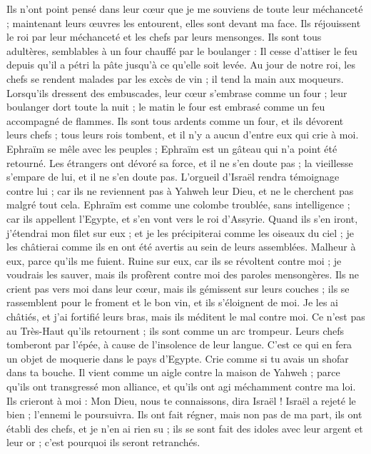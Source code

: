 \begin{multicols}{2}
Ils n'ont point pensé dans leur cœur que je me souviens de toute leur méchanceté ; maintenant leurs œuvres les entourent, elles sont devant ma face.
Ils réjouissent le roi par leur méchanceté et les chefs par leurs mensonges.
Ils sont tous adultères, semblables à un four chauffé par le boulanger : Il cesse d’attiser le feu depuis qu’il a pétri la pâte jusqu'à ce qu'elle soit levée.
Au jour de notre roi, les chefs se rendent malades par les excès de vin ; il tend la main aux moqueurs.
Lorsqu’ils dressent des embuscades, leur cœur s’embrase comme un four ; leur boulanger dort toute la nuit ; le matin le four est embrasé comme un feu accompagné de flammes.
Ils sont tous ardents comme un four, et ils dévorent leurs chefs ; tous leurs rois tombent, et il n'y a aucun d'entre eux qui crie à moi.
Ephraïm se mêle avec les peuples ; Ephraïm est un gâteau qui n'a point été retourné.
Les étrangers ont dévoré sa force, et il ne s’en doute pas ; la vieillesse s’empare de lui, et il ne s’en doute pas.
L'orgueil d'Israël rendra témoignage contre lui ; car ils ne reviennent pas à Yahweh leur Dieu, et ne le cherchent pas malgré tout cela.
Ephraïm est comme une colombe troublée, sans intelligence ; car ils appellent l'Egypte, et s’en vont vers le roi d'Assyrie.
Quand ils s’en iront, j'étendrai mon filet sur eux ; et je les précipiterai comme les oiseaux du ciel ; je les châtierai comme ils en ont été avertis au sein de leurs assemblées.
Malheur à eux, parce qu'ils me fuient. Ruine sur eux, car ils se révoltent contre moi ; je voudrais les sauver, mais ils profèrent contre moi des paroles mensongères.
Ils ne crient pas vers moi dans leur cœur, mais ils gémissent sur leurs couches ; ils se rassemblent pour le froment et le bon vin, et ils s’éloignent de moi.
Je les ai châtiés, et j'ai fortifié leurs bras, mais ils méditent le mal contre moi.
Ce n’est pas au Très-Haut qu’ils retournent ; ils sont comme un arc trompeur. Leurs chefs tomberont par l’épée, à cause de l’insolence de leur langue. C’est ce qui en fera un objet de moquerie dans le pays d'Egypte.
\VerseOne{}Crie comme si tu avais un shofar dans ta bouche. Il vient comme un aigle contre la maison de Yahweh ; parce qu’ils ont transgressé mon alliance, et qu’ils ont agi méchamment contre ma loi.
Ils crieront à moi : Mon Dieu, nous te connaissons, dira Israël !
Israël a rejeté le bien ; l'ennemi le poursuivra.
Ils ont fait régner, mais non pas de ma part, ils ont établi des chefs, et je n'en ai rien su ; ils se sont fait des idoles avec leur argent et leur or ; c'est pourquoi ils seront retranchés.

\end{multicols}
